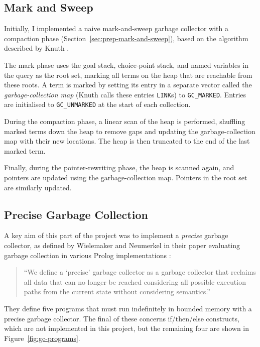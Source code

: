 \subsection{Mark and Sweep}

\label{sec:mark-and-sweep}

Initially, I implemented a naive mark-and-sweep garbage collector with a compaction phase (Section~\ref{sec:prep-mark-and-sweep}), based on the algorithm described by Knuth \cite{knuthArtComputerProgramming1997}.

The mark phase uses the goal stack, choice-point stack, and named variables in the query as the root set, marking all terms on the heap that are reachable from these roots. A term is marked by setting its entry in a separate vector called the \emph{garbage-collection map} (Knuth calls these entries \texttt{LINK}s) to \texttt{GC\_MARKED}. Entries are initialised to \texttt{GC\_UNMARKED} at the start of each collection.

During the compaction phase, a linear scan of the heap is performed, shuffling marked terms down the heap to remove gaps and updating the garbage-collection map with their new locations. The heap is then truncated to the end of the last marked term.

Finally, during the pointer-rewriting phase, the heap is scanned again, and pointers are updated using the garbage-collection map. Pointers in the root set are similarly updated.

\subsection{Precise Garbage Collection}

\label{sec:precise-gc}

A key aim of this part of the project was to implement a \emph{precise} garbage collector, as defined by Wielemaker and Neumerkel in their paper evaluating garbage collection in various Prolog implementations \cite{wielemakerPreciseGarbageCollection2008}:

\begin{quote}
``We define a `precise' garbage collector as a garbage collector that reclaims all data that can no longer be reached considering all possible execution paths from the current state without considering semantics.''
\end{quote}

They define five programs that must run indefinitely in bounded memory with a precise garbage collector. The final of these concerns if/then/else constructs, which are not implemented in this project, but the remaining four are shown in Figure~\ref{fig:gc-programs}.

